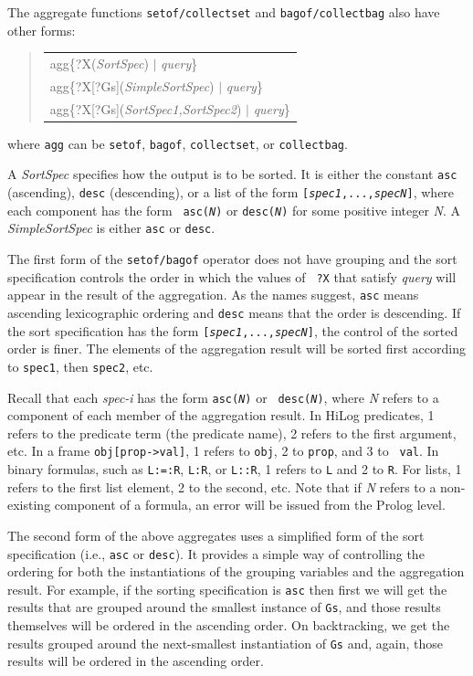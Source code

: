 \documentclass[11pt]{article}
\newenvironment{qrules}{\begin{quote}\tt\begin{tabular}[t]{l}}%
{\end{tabular}\end{quote}}
\begin{document}
The aggregate functions {\tt setof/collectset} and {\tt bagof/collectbag}
also have other forms:  
\begin{qrules}
agg\{?X({\it SortSpec}) $|$ {\it query}\}\\
agg\{?X[?Gs]({\it SimpleSortSpec}) $|$ {\it query}\}\\
agg\{?X[?Gs]({\it SortSpec1,SortSpec2}) $|$ {\it query}\}
\end{qrules}
where {\tt agg} can be {\tt setof}, {\tt bagof}, {\tt collectset}, or
{\tt collectbag}.     

A {\it SortSpec} specifies how the output is to be sorted. It is either the
constant {\tt asc} (ascending), {\tt desc} (descending), or a list of the
form {\tt [{\it spec1},...,{\it specN}]}, where each component has the form {\tt
  asc({\it N})} or {\tt desc({\it N})} for some positive integer {\it N}.      
A {\it SimpleSortSpec} is either {\tt asc} or {\tt desc}.   

The first form of the {\tt setof/bagof} operator does not have grouping 
and the sort specification controls the order in which the values of {\tt
  ?X} that satisfy {\it query} will appear in the result of the aggregation.
As the names suggest, {\tt asc} means ascending
lexicographic ordering and {\tt desc} means that the order is descending.  
If the sort specification has the form {\tt [{\it spec1},...,{\it specN}]},
the control of the sorted order is finer. The elements of the aggregation
result will be sorted first according to {\tt spec1}, then {\tt spec2}, etc.

Recall that each \emph{spec-i}  has the form {\tt asc({\it N})} or {\tt
  desc({\it N})}, where \emph{N} refers to a component of each
member of the aggregation result. In HiLog predicates, 1 refers to the predicate term
(the predicate name), 2 refers to the first argument, etc. In a frame
{\tt obj[prop->val]}, 1 refers to {\tt obj}, 2 to {\tt prop}, and 3 to {\tt
  val}. In binary formulas, such as {\tt L:=:R}, {\tt L:R}, or {\tt L::R},
1 refers to {\tt L} and 2 to {\tt R}.  
For lists, 1 refers to the first list element, 2 to the second, etc.
Note that if {\it N} refers to a non-existing component of a formula, an
error will be issued from the Prolog level.

The second form of the above aggregates uses a simplified form of the sort
specification (i.e., {\tt asc} or {\tt desc}). It provides a simple way of
controlling the ordering for both the instantiations of the grouping variables  
and the aggregation result. For example, if the sorting specification is
{\tt asc} then first we will get the results that are grouped around the
smallest instance of {\tt Gs}, and those results themselves will be ordered
in the ascending order. On backtracking, we get the results grouped around
the next-smallest instantiation of {\tt Gs} and, again, those results will
be ordered in the ascending order.
\end{document}
